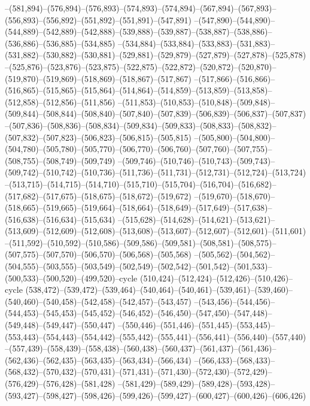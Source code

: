 --(581,894)--(576,894)--(576,893)--(574,893)--(574,894)--(567,894)--(567,893)--(556,893)--(556,892)--(551,892)--(551,891)--(547,891)
--(547,890)--(544,890)--(544,889)--(542,889)--(542,888)--(539,888)--(539,887)--(538,887)--(538,886)--(536,886)--(536,885)--(534,885)
--(534,884)--(533,884)--(533,883)--(531,883)--(531,882)--(530,882)--(530,881)--(529,881)--(529,879)--(527,879)--(527,878)--(525,878)
--(525,876)--(523,876)--(523,875)--(522,875)--(522,872)--(520,872)--(520,870)--(519,870)--(519,869)--(518,869)--(518,867)--(517,867)
--(517,866)--(516,866)--(516,865)--(515,865)--(515,864)--(514,864)--(514,859)--(513,859)--(513,858)--(512,858)--(512,856)--(511,856)
--(511,853)--(510,853)--(510,848)--(509,848)--(509,844)--(508,844)--(508,840)--(507,840)--(507,839)--(506,839)--(506,837)--(507,837)
--(507,836)--(508,836)--(508,834)--(509,834)--(509,833)--(508,833)--(508,832)--(507,832)--(507,823)--(506,823)--(506,815)--(505,815)
--(505,800)--(504,800)--(504,780)--(505,780)--(505,770)--(506,770)--(506,760)--(507,760)--(507,755)--(508,755)--(508,749)--(509,749)
--(509,746)--(510,746)--(510,743)--(509,743)--(509,742)--(510,742)--(510,736)--(511,736)--(511,731)--(512,731)--(512,724)--(513,724)
--(513,715)--(514,715)--(514,710)--(515,710)--(515,704)--(516,704)--(516,682)--(517,682)--(517,675)--(518,675)--(518,672)--(519,672)
--(519,670)--(518,670)--(518,665)--(519,665)--(519,664)--(518,664)--(518,649)--(517,649)--(517,638)--(516,638)--(516,634)--(515,634)
--(515,628)--(514,628)--(514,621)--(513,621)--(513,609)--(512,609)--(512,608)--(513,608)--(513,607)--(512,607)--(512,601)--(511,601)
--(511,592)--(510,592)--(510,586)--(509,586)--(509,581)--(508,581)--(508,575)--(507,575)--(507,570)--(506,570)--(506,568)--(505,568)
--(505,562)--(504,562)--(504,555)--(503,555)--(503,549)--(502,549)--(502,542)--(501,542)--(501,533)--(500,533)--(500,520)--(499,520)--cycle
(510,424)--(512,424)--(512,426)--(510,426)--cycle
(538,472)--(539,472)--(539,464)--(540,464)--(540,461)--(539,461)--(539,460)--(540,460)--(540,458)--(542,458)--(542,457)--(543,457)
--(543,456)--(544,456)--(544,453)--(545,453)--(545,452)--(546,452)--(546,450)--(547,450)--(547,448)--(549,448)--(549,447)--(550,447)
--(550,446)--(551,446)--(551,445)--(553,445)--(553,443)--(554,443)--(554,442)--(555,442)--(555,441)--(556,441)--(556,440)--(557,440)
--(557,439)--(558,439)--(558,438)--(560,438)--(560,437)--(561,437)--(561,436)--(562,436)--(562,435)--(563,435)--(563,434)--(566,434)
--(566,433)--(568,433)--(568,432)--(570,432)--(570,431)--(571,431)--(571,430)--(572,430)--(572,429)--(576,429)--(576,428)--(581,428)
--(581,429)--(589,429)--(589,428)--(593,428)--(593,427)--(598,427)--(598,426)--(599,426)--(599,427)--(600,427)--(600,426)--(606,426)
